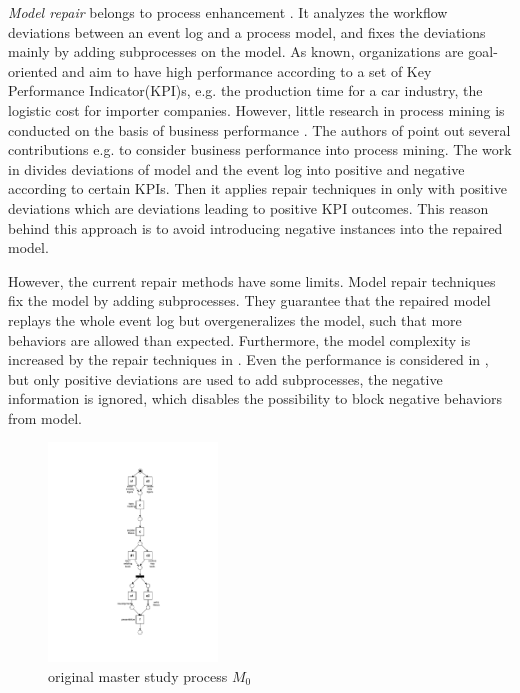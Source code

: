 \emph{Model repair} belongs to process enhancement \cite{fahland2012repairing}. It analyzes the workflow deviations between an event log and a process model, and fixes the deviations mainly by adding subprocesses on the model. As known, organizations are goal-oriented and aim to have high performance according to a set of Key Performance Indicator(KPI)s, e.g. the production time for a car industry, the logistic cost for importer companies.  However, little research in process mining is conducted on the basis of business performance \cite{ghasemi2019event}.  The authors of  \cite{ghasemi2019event} point out several contributions e.g.   \cite{dees2017enhancing} to consider business performance into process mining. The work in  \cite{dees2017enhancing} divides deviations of model and the event log into positive and negative according to certain KPIs. Then it applies repair techniques in  \cite{fahland2012repairing} only with positive deviations which are deviations leading to positive KPI outcomes. This reason behind this approach  is to avoid introducing negative instances into the repaired model. 

However, the current repair methods have some limits. Model repair techniques fix the model by adding subprocesses. They guarantee that the repaired model replays the whole event log but overgeneralizes the model, such that more behaviors are allowed than expected. Furthermore, the model complexity is increased by the repair techniques in \cite{fahland2012repairing}.  Even the performance is considered in  \cite{dees2017enhancing}, but only positive deviations are used to add subprocesses, the negative information is ignored, which disables the possibility to block negative behaviors from model.
 
\begin{figure}
	\centering
	\includegraphics[clip, trim=8.5cm 3cm 7cm 3cm, width=0.4\textwidth, height=0.6\textheight]{figures/introduction/thesis-demo-final-original-model.pdf}
	\caption{original master study process $M_0$}
	\label{fig:demo-M0}
\end{figure} 

